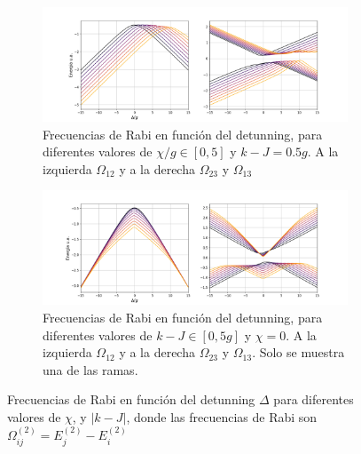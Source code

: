 \begin{figure}
    \centering
    \begin{subfigure}{\textwidth}
        \includegraphics[width=\textwidth]{figuras/ch4/frecuencias k=0.5g chilist.png}
        \caption{Frecuencias de Rabi en función del detunning, para diferentes valores de $\chi/g\in[0,5]$ y $k-J=0.5g$. A la izquierda $\Omega_{12}$ y a la derecha $\Omega_{23}$ y $\Omega_{13}$}
        \label{fig4:rabi chi}
    \end{subfigure}
    \vfill
    \begin{subfigure}{\textwidth}
        \includegraphics[width=\textwidth]{figuras/ch4/frecuencias x=0 klist.png}
        \caption{Frecuencias de Rabi en función del detunning, para diferentes valores de $k-J\in[0,5g]$ y $\chi=0$. A la izquierda $\Omega_{12}$ y a la derecha $\Omega_{23}$ y $\Omega_{13}$. Solo se muestra una de las ramas.}
        \label{fig4:rabi k}
    \end{subfigure}
    \caption{Frecuencias de Rabi en función del detunning $\Delta$ para diferentes valores de $\chi$, y $|k-J|$, donde las frecuencias de Rabi son $\Omega^{(2)}_{ij}=E^{(2)}_{j}-E^{(2)}_{i}$}
    \label{fig4:frecuencias de rabi}
\end{figure}
